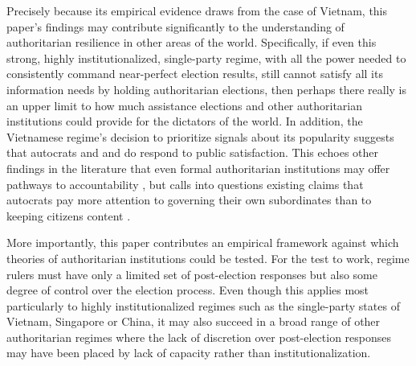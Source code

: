 \documentclass[12pt]{article}
\newcommand{\1}{\mathbbm{1}}
\begin{document}
Precisely because its empirical evidence draws from the case of Vietnam, this paper's findings may contribute significantly to the understanding of authoritarian resilience in other areas of the world. Specifically, if even this strong, highly institutionalized, single-party regime, with all the power needed to consistently command near-perfect election results, still cannot satisfy all its information needs by holding authoritarian elections, then perhaps there really is an upper limit to how much assistance elections and other authoritarian institutions could provide for the dictators of the world. In addition, the Vietnamese regime's decision to prioritize signals about its popularity suggests that autocrats and and do respond to public satisfaction. This echoes other findings in the literature that even formal authoritarian institutions may offer pathways to accountability \citep[e.g.][]{Miller2015,Lorentzen2013}, but calls into questions existing claims that autocrats pay more attention to governing their own subordinates than to keeping citizens content \citep[e.g.][]{Svolik2012}.

More importantly, this paper contributes an empirical framework against which theories of authoritarian institutions could be tested. For the test to work, regime rulers must have only a limited set of post-election responses but also some degree of control over the election process. Even though this applies most particularly to highly institutionalized regimes such as the single-party states of Vietnam, Singapore or China, it may also succeed in a broad range of other authoritarian regimes where the lack of discretion over post-election responses may have been placed by lack of capacity rather than institutionalization.

\newpage
{}
\printbibliography[heading=bibintoc]
\end{document}

